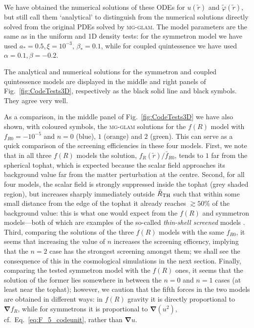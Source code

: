 We have obtained the numerical solutions of these ODEs for $u(\tilde{r})$ and $\tilde{\varphi}(\tilde{r})$, but still call them `analytical' to distinguish from the numerical solutions directly solved from the original PDEs solved by \textsc{mg-glam}. The model parameters are the same as in the uniform and 1D density tests: for the symmetron model we have used $a_\ast = 0.5, \xi = 10^{-3}$, $\beta_\ast = 0.1$, while for coupled quintessence we have used $\alpha = 0.1, \beta = -0.2$.

The analytical and numerical solutions for the symmetron and coupled quintessence models are displayed in the middle and right panels of Fig.~\ref{fig:CodeTests3D}, respectively as the black solid line and black symbols. They agree very well.

As a comparison, in the middle panel of Fig.~\ref{fig:CodeTests3D} we have also shown, with coloured symbols, the \textsc{mg-glam} solutions for the $f(R)$ model with $f_{R0}=-10^{-5}$ and $n=0$ (blue), $1$ (orange) and $2$ (green). This can serve as a quick comparison of the screening efficiencies in these four models. First, we note that in all three $f(R)$ models the solution, $f_R(\tilde{r})/\bar{f}_{R0}$, tends to $1$ far from the spherical tophat, which is expected because the scalar field approaches its background value far from the matter perturbation at the centre. Second, for all four models, the scalar field is strongly suppressed inside the tophat (grey shaded region), but increases sharply immediately outside $\tilde{R}_{\rm TH}$ such that within some small distance from the edge of the tophat it already reaches $\gtrsim50\%$ of the background value: this is what one would expect from the $f(R)$ and symmetron models---both of which are examples of the so-called \textit{thin-shell screened} models \cite{Brax:2012gr}. Third, comparing the solutions of the three $f(R)$ models with the same $f_{R0}$, it seems that increasing the value of $n$ increases the screening efficency, implying that the $n=2$ case has the strongest screening amongst them; we shall see the consequence of this in the cosmological simulations in the next section. Finally, comparing the tested symmetron model with the $f(R)$ ones, it seems that the solution of the former lies somewhere in between the $n=0$ and $n=1$ cases (at least near the tophat); however, we caution that the fifth forces in the two models are obtained in different ways: in $f(R)$ gravity it is directly proportional to $\boldsymbol{\nabla}f_{R}$, while for symmetrons it is proportional to $\boldsymbol{\nabla}\left(u^2\right)$, cf.~Eq.~\eqref{eq:F_5_codeunit}, rather than $\boldsymbol{\nabla}u$. 




